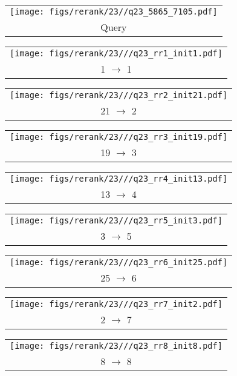 \begin{figure*}[t]
\begin{tabular}{@{\sssp}c@{\sssp}}\texttt{[image: figs/rerank/23//q23\_5865\_7105.pdf]}\\Query\\ \end{tabular} 
\begin{tabular}{@{\sssp}c@{\sssp}}\texttt{[image: figs/rerank/23///q23\_rr1\_init1.pdf]}\\1 $\rightarrow$ 1\\ \end{tabular} 
\begin{tabular}{@{\sssp}c@{\sssp}}\texttt{[image: figs/rerank/23///q23\_rr2\_init21.pdf]}\\21 $\rightarrow$ 2\\ \end{tabular} 
\begin{tabular}{@{\sssp}c@{\sssp}}\texttt{[image: figs/rerank/23///q23\_rr3\_init19.pdf]}\\19 $\rightarrow$ 3\\ \end{tabular} 
\begin{tabular}{@{\sssp}c@{\sssp}}\texttt{[image: figs/rerank/23///q23\_rr4\_init13.pdf]}\\13 $\rightarrow$ 4\\ \end{tabular} 
\begin{tabular}{@{\sssp}c@{\sssp}}\texttt{[image: figs/rerank/23///q23\_rr5\_init3.pdf]}\\3 $\rightarrow$ 5\\ \end{tabular} 
\begin{tabular}{@{\sssp}c@{\sssp}}\texttt{[image: figs/rerank/23///q23\_rr6\_init25.pdf]}\\25 $\rightarrow$ 6\\ \end{tabular} 
\begin{tabular}{@{\sssp}c@{\sssp}}\texttt{[image: figs/rerank/23///q23\_rr7\_init2.pdf]}\\2 $\rightarrow$ 7\\ \end{tabular} 
\begin{tabular}{@{\sssp}c@{\sssp}}\texttt{[image: figs/rerank/23///q23\_rr8\_init8.pdf]}\\8 $\rightarrow$ 8\\ \end{tabular} 
  

\end{figure*}

